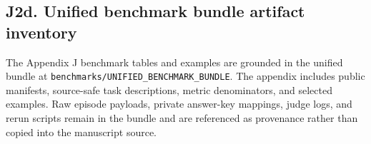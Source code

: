 
\subsection{\texorpdfstring{\textbf{J2d. Unified benchmark bundle artifact inventory}}{J2d. Unified benchmark bundle artifact inventory}}\label{j2d.-unified-benchmark-bundle-artifact-inventory}

The Appendix J benchmark tables and examples are grounded in the unified bundle at \nolinkurl{benchmarks/UNIFIED_BENCHMARK_BUNDLE}. The appendix includes public manifests, source-safe task descriptions, metric denominators, and selected examples. Raw episode payloads, private answer-key mappings, judge logs, and rerun scripts remain in the bundle and are referenced as provenance rather than copied into the manuscript source.

